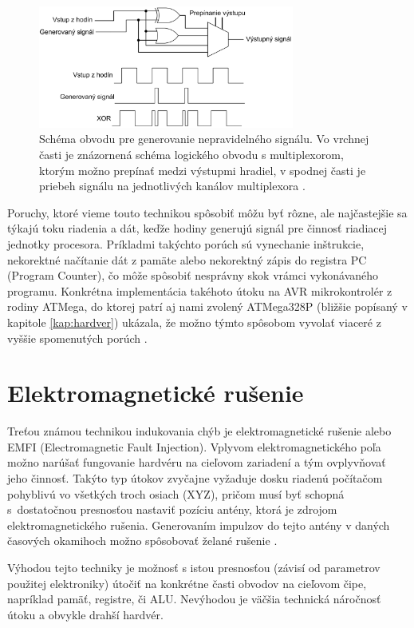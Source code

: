 \begin{figure}
    \centerline{\includegraphics[width=0.75\textwidth]{images/clock.png}}
    \caption[Schéma obvodu pre generovanie nepravidelného signálu]{Schéma obvodu pre generovanie nepravidelného signálu. Vo vrchnej časti je znázornená schéma logického obvodu s multiplexorom, ktorým možno prepínať medzi výstupmi hradiel, v spodnej časti je priebeh signálu na jednotlivých kanálov multiplexora \cite{clockCircuit}.}
    \label{obr:clock}
\end{figure}

Poruchy, ktoré vieme touto technikou spôsobiť môžu byť rôzne, ale najčastejšie sa týkajú toku riadenia a dát, keďže hodiny generujú signál pre činnosť riadiacej jednotky procesora. Príkladmi takýchto porúch sú vynechanie inštrukcie, nekorektné načítanie dát z pamäte alebo nekorektný zápis do registra PC (Program Counter), čo môže spôsobiť nesprávny skok vrámci vykonávaného programu. Konkrétna implementácia takéhoto útoku na AVR mikrokontrolér z rodiny ATMega, do ktorej patrí aj nami zvolený ATMega328P (bližšie popísaný v kapitole \ref{kap:hardver}) ukázala, že možno týmto spôsobom vyvolať viaceré z vyššie spomenutých porúch \cite{clock}.

\section{Elektromagnetické rušenie}
Treťou známou technikou indukovania chýb je elektromagnetické rušenie alebo EMFI (Electromagnetic Fault Injection). Vplyvom elektromagnetického poľa možno narúšať fungovanie hardvéru na cieľovom zariadení a tým ovplyvňovať jeho činnosť. Takýto typ útokov zvyčajne vyžaduje dosku riadenú počítačom pohyblivú vo všetkých troch osiach (XYZ), pričom musí byť schopná s~dostatočnou presnosťou nastaviť pozíciu antény, ktorá je zdrojom elektromagnetického rušenia. Generovaním impulzov do tejto antény v daných časových okamihoch možno spôsobovať želané rušenie \cite{emfi}.

Výhodou tejto techniky je možnosť s istou presnosťou (závisí od parametrov použitej elektroniky) útočiť na konkrétne časti obvodov na cieľovom čipe, napríklad pamäť, registre, či ALU. Nevýhodou je väčšia technická náročnosť útoku a obvykle drahší hardvér.

